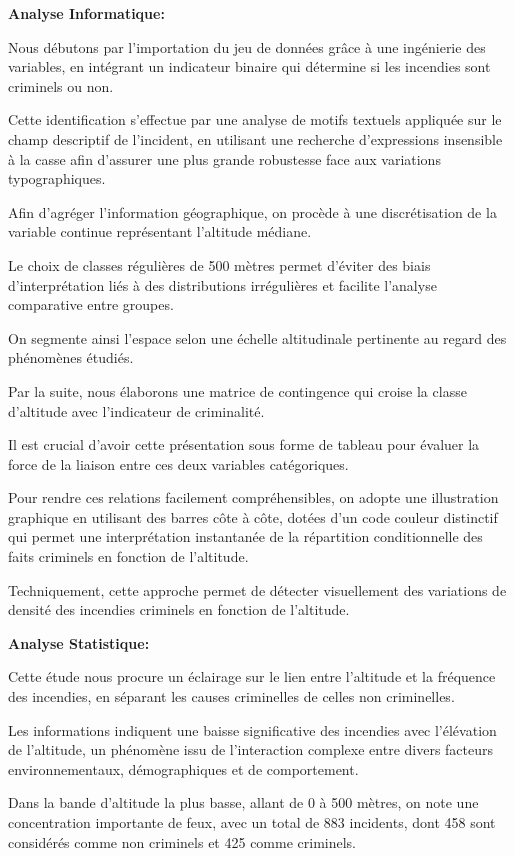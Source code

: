 \documentclass[
]{article}
\begin{document}
\textbf{Analyse Informatique:}

Nous débutons par l'importation du jeu de données grâce à une ingénierie
des variables, en intégrant un indicateur binaire qui détermine si les
incendies sont criminels ou non.

Cette identification s'effectue par une analyse de motifs textuels
appliquée sur le champ descriptif de l'incident, en utilisant une
recherche d'expressions insensible à la casse afin d'assurer une plus
grande robustesse face aux variations typographiques.

Afin d'agréger l'information géographique, on procède à une
discrétisation de la variable continue représentant l'altitude médiane.

Le choix de classes régulières de 500 mètres permet d'éviter des biais
d'interprétation liés à des distributions irrégulières et facilite
l'analyse comparative entre groupes.

On segmente ainsi l'espace selon une échelle altitudinale pertinente au
regard des phénomènes étudiés.

Par la suite, nous élaborons une matrice de contingence qui croise la
classe d'altitude avec l'indicateur de criminalité.

Il est crucial d'avoir cette présentation sous forme de tableau pour
évaluer la force de la liaison entre ces deux variables catégoriques.

Pour rendre ces relations facilement compréhensibles, on adopte une
illustration graphique en utilisant des barres côte à côte, dotées d'un
code couleur distinctif qui permet une interprétation instantanée de la
répartition conditionnelle des faits criminels en fonction de
l'altitude.

Techniquement, cette approche permet de détecter visuellement des
variations de densité des incendies criminels en fonction de l'altitude.

\textbf{Analyse Statistique:}

Cette étude nous procure un éclairage sur le lien entre l'altitude et la
fréquence des incendies, en séparant les causes criminelles de celles
non criminelles.

Les informations indiquent une baisse significative des incendies avec
l'élévation de l'altitude, un phénomène issu de l'interaction complexe
entre divers facteurs environnementaux, démographiques et de
comportement.

Dans la bande d'altitude la plus basse, allant de 0 à 500 mètres, on
note une concentration importante de feux, avec un total de 883
incidents, dont 458 sont considérés comme non criminels et 425 comme
criminels.
\end{document}
